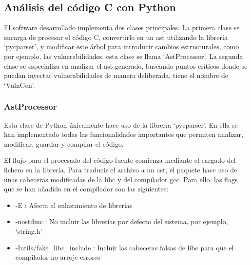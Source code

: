 \subsection{Análisis del código C con Python}
El software desarrollado implementa dos clases principales. La primera clase se encarga de procesar el código C, convertirlo en un \acrshort{ast} utilizando la librería `pycparser', y modificar este árbol para introducir cambios estructurales, como por ejemplo, las vulnerabilidades, esta clase se llama `AstProcessor'. La segunda clase se especializa en analizar el \acrshort{ast} generado, buscando puntos críticos donde se puedan inyectar vulnerabilidades de manera deliberada, tiene el nombre de `VulnGen'.

\subsubsection{AstProcessor} \label{subsub:astproc}
Esta clase de Python únicamente hace uso de la librería `pycparser'. En ella se han implementado todas las funcionalidades importantes que permiten analizar, modificar, guardar y compilar el código.

El flujo para el procesado del código fuente comienza mediante el cargado del fichero en la librería. Para traducir el archivo a un \acrshort{ast}, el paquete hace uso de unas cabeceras modificadas de la \acrfull{libc} y del compilador \acrfull{gcc}. Para ello, las flags que se han añadido en el compilador son las siguientes:
\begin{itemize}
    \item -E : Afecta al enlazamiento de librerías
    \item -nostdinc : No incluir las librerías por defecto del sistema, por ejemplo, `string.h'
    \item -Iutils/fake\_libc\_include : Incluir las cabeceras falsas de libc para que el compilador no arroje errores
\end{itemize}

